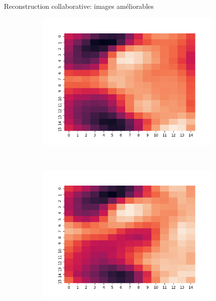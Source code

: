 \documentclass[hyperref={pdfpagelabels=false}]{beamer}
\begin{document}
\begin{frame}{Reconstruction collaborative: images améliorables}
\begin{figure}[h]
\begin{subfigure}[c]{0.18\textwidth}
                \includegraphics[scale=.12]{44}
            \end{subfigure}
            \\
            \begin{subfigure}[c]{0.18\textwidth}
                \includegraphics[scale=.12]{55}
            \end{subfigure}
            \begin{subfigure}[c]{0.18\textwidth}

\end{subfigure}
\end{figure}
\end{frame}
\end{document}
